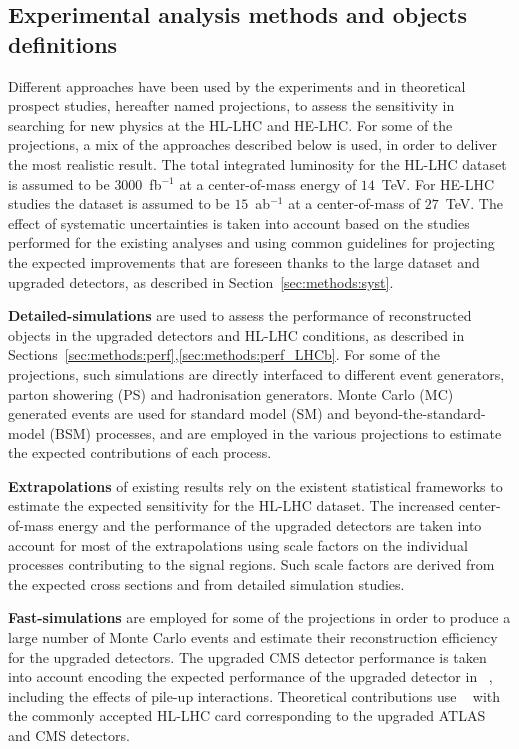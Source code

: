 
\subsection{Experimental analysis methods and objects definitions}

Different approaches have been used by the experiments and in theoretical prospect studies, hereafter named projections, to assess the sensitivity in searching for new physics at the HL-LHC and HE-LHC.
For some of the projections, a mix of the approaches described below is used, in order to deliver the most realistic result.
The total integrated luminosity for the HL-LHC dataset is assumed to be $3000$~fb$^{-1}$ at a center-of-mass energy of $14$~TeV. For HE-LHC studies the dataset is assumed to be $15$~ab$^{-1}$ at a center-of-mass of $27$~TeV.
The effect of systematic uncertainties is taken into account based on the studies performed for the existing analyses and using common guidelines for projecting the expected improvements that are foreseen thanks to the large dataset and upgraded detectors, as described in Section~\ref{sec:methods:syst}.

{\bf Detailed-simulations} are used to assess the performance of reconstructed objects in the upgraded detectors and HL-LHC conditions, as described in Sections~\ref{sec:methods:perf},\ref{sec:methods:perf_LHCb}.
For some of the projections, such simulations are directly interfaced to different event generators, parton showering (PS) and hadronisation generators. Monte Carlo (MC) generated events are used for standard model (SM) and beyond-the-standard-model (BSM) processes, and are employed in the various projections to estimate the expected contributions of each process.

{\bf Extrapolations} of existing results rely on the existent statistical frameworks to estimate the expected sensitivity for the HL-LHC dataset.
The increased center-of-mass energy and the performance of the upgraded detectors are taken into account for most of the extrapolations using scale factors on the individual processes contributing to the signal regions. Such scale factors are derived from the expected cross sections and from detailed simulation studies.

{\bf Fast-simulations} are employed for some of the projections in order to produce a large number of Monte Carlo events and estimate their reconstruction efficiency for the upgraded detectors. The upgraded CMS detector performance is taken into account encoding the expected performance of the upgraded detector in \delphes~\cite{deFavereau:2013fsa}, including the effects of pile-up interactions. Theoretical contributions use \delphes~\cite{deFavereau:2013fsa} with the commonly accepted HL-LHC card corresponding to the upgraded ATLAS and CMS detectors.


